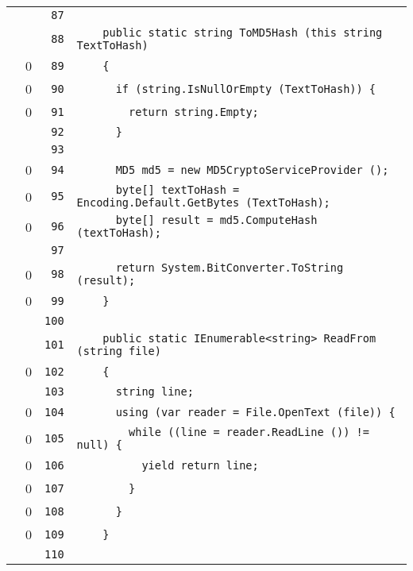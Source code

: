 \documentclass[a4paper,10pt]{article}
\begin{document}
\begin{longtable}[l]{lrrl}
\cellcolor{gray} &  & \verb~87~ & \verb~~\\
\cellcolor{gray} &  & \verb~88~ & \verb~    public static string ToMD5Hash (this string TextToHash)~\\
\cellcolor{red} & 0 & \verb~89~ & \verb~    {~\\
\cellcolor{red} & 0 & \verb~90~ & \verb~      if (string.IsNullOrEmpty (TextToHash)) {~\\
\cellcolor{red} & 0 & \verb~91~ & \verb~        return string.Empty;~\\
\cellcolor{gray} &  & \verb~92~ & \verb~      }~\\
\cellcolor{gray} &  & \verb~93~ & \verb~~\\
\cellcolor{red} & 0 & \verb~94~ & \verb~      MD5 md5 = new MD5CryptoServiceProvider ();~\\
\cellcolor{red} & 0 & \verb~95~ & \verb~      byte[] textToHash = Encoding.Default.GetBytes (TextToHash);~\\
\cellcolor{red} & 0 & \verb~96~ & \verb~      byte[] result = md5.ComputeHash (textToHash);~\\
\cellcolor{gray} &  & \verb~97~ & \verb~~\\
\cellcolor{red} & 0 & \verb~98~ & \verb~      return System.BitConverter.ToString (result);~\\
\cellcolor{red} & 0 & \verb~99~ & \verb~    }~\\
\cellcolor{gray} &  & \verb~100~ & \verb~~\\
\cellcolor{gray} &  & \verb~101~ & \verb~    public static IEnumerable<string> ReadFrom (string file)~\\
\cellcolor{red} & 0 & \verb~102~ & \verb~    {~\\
\cellcolor{gray} &  & \verb~103~ & \verb~      string line;~\\
\cellcolor{red} & 0 & \verb~104~ & \verb~      using (var reader = File.OpenText (file)) {~\\
\cellcolor{red} & 0 & \verb~105~ & \verb~        while ((line = reader.ReadLine ()) != null) {~\\
\cellcolor{red} & 0 & \verb~106~ & \verb~          yield return line;~\\
\cellcolor{red} & 0 & \verb~107~ & \verb~        }~\\
\cellcolor{red} & 0 & \verb~108~ & \verb~      }~\\
\cellcolor{red} & 0 & \verb~109~ & \verb~    }~\\
\cellcolor{gray} &  & \verb~110~ & \verb~~\\

\end{longtable}
\end{document}
